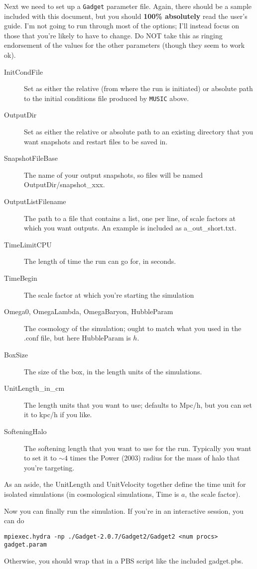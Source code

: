 \documentclass[10pt,a4paper,onecolumn]{article}
\begin{document}
Next we need to set up a \texttt{Gadget} parameter file.  Again, there should be 
a sample included with this document, but you should \textbf{100\% absolutely} 
read the user's guide.  I'm not going to run through most of the options; I'll instead 
focus on those that you're likely to have to change.  Do NOT take this as ringing
endorsement of the values for the other parameters (though they seem to work ok).
\begin{description}
\item[InitCondFile] Set as either the relative (from where the run is initiated) or
absolute path to the initial conditions file produced by \texttt{MUSIC} above.  
\item[OutputDir] Set as either the relative or absolute path to an existing directory
that you want snapshots and restart files to be saved in.
\item[SnapshotFileBase] The name of your output snapshots, so files will be named 
OutputDir/snapshot\_xxx.
\item[OutputListFilename] The path to a file that contains a list, one per line, of
scale factors at which you want outputs.  An example is included as a\_out\_short.txt.
\item[TimeLimitCPU] The length of time the run can go for, in seconds.
\item[TimeBegin] The scale factor at which you're starting the simulation
\item[Omega0, OmegaLambda, OmegaBaryon, HubbleParam] The
cosmology of the simulation; ought to match what you used in the .conf file,
but here HubbleParam is $h$.
\item[BoxSize] The size of the box, in the length units of the simulations.
\item[UnitLength\_in\_cm] The length units that you want to use; defaults to Mpc/h,
but you can set it to kpc/h if you like.
\item[SofteningHalo] The softening length that you want to use for the run.  Typically
you want to set it to $\sim4$ times the Power (2003) radius for the mass of halo that
you're targeting.
\end{description}
As an aside, the UnitLength and UnitVelocity together define the time unit for isolated
simulations (in cosmological simulations, Time is $a$, the scale factor).

Now you can finally run the simulation.  If you're in an interactive session, you can do
\begin{verbatim}
mpiexec.hydra -np ./Gadget-2.0.7/Gadget2/Gadget2 <num procs> gadget.param
\end{verbatim}
Otherwise, you should wrap that in a PBS script like the included gadget.pbs.
\end{document}
